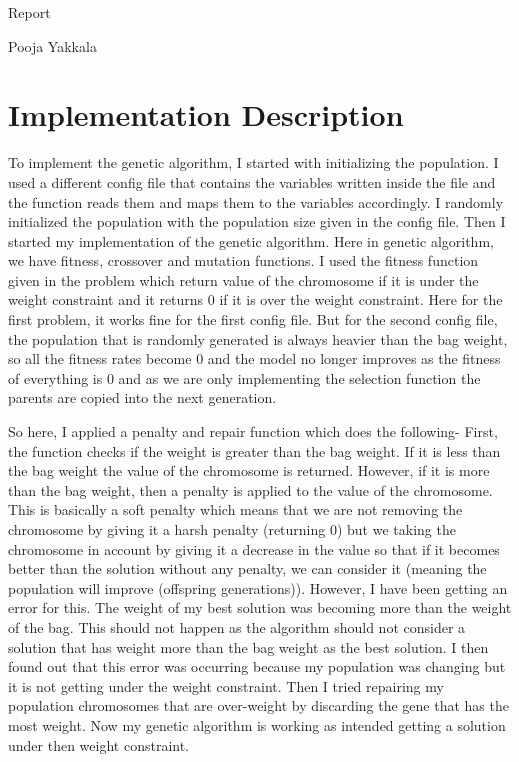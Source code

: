 \documentclass{article}
\begin{document}
\begin{titlepage}
\begin{center} 

        \Huge{Report} \vspace{1cm} 
        
        \large{Pooja Yakkala} \vspace{0.3cm}
        
        
    \end{center} 
\end{titlepage}

\section*{Implementation Description}
To implement the genetic algorithm, I started with initializing the population. I used a different config file that contains the variables written inside the file and the function reads them and maps them to the variables accordingly. I randomly initialized the population with the population size given in the config file. Then I started my implementation of the genetic algorithm. Here in genetic algorithm, we have fitness, crossover and mutation functions. I used the fitness function given in the problem which return value of the chromosome if it is under the weight constraint and it returns 0 if it is over the weight constraint. Here for the first problem, it works fine for the first config file. But for the second config file, the population that is randomly generated is always heavier than the bag weight, so all the fitness rates become 0 and the model no longer improves as the fitness of everything is 0 and as we are only implementing the selection function the parents are copied into the next generation. 

So here, I applied a penalty and repair function which does the following- First, the function checks if the weight is greater than the bag weight. If it is less than the bag weight the value of the chromosome is returned. However, if it is more than the bag weight, then a penalty is applied to the value of the chromosome. This is basically a soft penalty which means that we are not removing the chromosome by giving it a harsh penalty (returning 0) but we taking the chromosome in account by giving it a decrease in the value so that if it becomes better than the solution without any penalty, we can consider it (meaning the population will improve (offspring generations)). However, I have been getting an error for this. The weight of my best solution was becoming more than the weight of the bag. This should not happen as the algorithm should not consider a solution that has weight more than the bag weight as the best solution. I then found out that this error was occurring because my population was changing but it is not getting under the weight constraint. Then I tried repairing my population chromosomes that are over-weight by discarding the gene that has the most weight. Now my genetic algorithm is working as intended getting a solution under then weight constraint.
\end{document}
